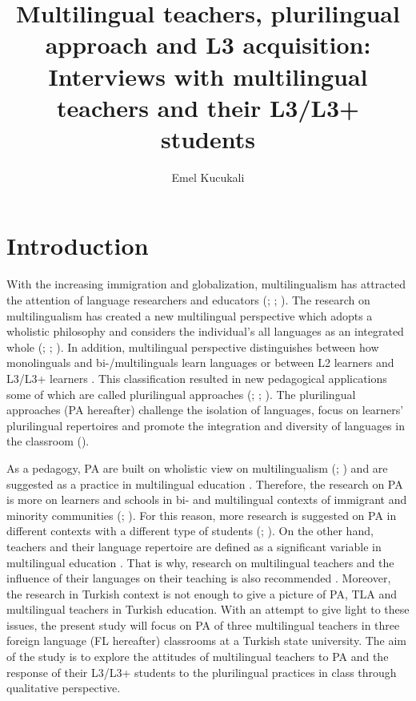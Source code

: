 \documentclass[output=paper]{../langscibook}
\author{Emel Kucukali\affiliation{Marmara University}\orcid{}}
\title{Multilingual teachers, plurilingual approach and L3 acquisition:  Interviews with multilingual teachers and their L3/L3+ students}
\begin{document}
\maketitle


\section{Introduction}


With the increasing immigration and globalization, multilingualism has attracted the attention of language researchers and educators (\citealt{CenozGenesee1998}; \citealt{Jessner1999}; \citealt{Cenoz2013a}). The research on multilingualism has created a new multilingual perspective which adopts a wholistic philosophy and considers the individual’s all languages as an integrated whole (\citealt{Cook1992}; \citealt{Grosjean2008}; \citealt{Cenoz2013a}). In addition, multilingual perspective distinguishes between how monolinguals and bi-\slash multilinguals learn languages or between L2 learners and L3/L3+ learners \citep{Hufeisen2004}. This classification resulted in new pedagogical applications some of which are called plurilingual approaches (\citealt{CouncilOfEurope2001}; \citealt{Cenoz2013a,Cenoz2013b}; \citealt{Otwinowska2014}). The plurilingual approaches (PA hereafter) challenge the isolation of languages, focus on learners' plurilingual repertoires and promote the integration and diversity of languages in the classroom (\citealt{BeaccoEtAl2010}).

As a pedagogy, PA are built on wholistic view on multilingualism (\citealt{Grosjean2008}; \citealt{Cenoz2013a,Cenoz2013b}) and are suggested as a practice in multilingual education \citep{Cenoz2009}. Therefore, the research on PA is more on learners and schools in bi- and multilingual contexts of immigrant and minority communities (\citealt{Cenoz2013b}; \citealt{GarciaLi2014}). For this reason, more research is suggested on PA in different contexts with a different type of students (\citealt{Cenoz2013a,Cenoz2013b}; \citealt{CenozGorter2017}). On the other hand, teachers and their language repertoire are defined as a significant variable in multilingual education \citep{Cenoz2009}. That is why, research on multilingual teachers and the influence of their languages on their teaching is also recommended \citep{Ellis2013}. Moreover, the research in Turkish context is not enough to give a picture of PA, TLA and multilingual teachers in Turkish education. With an attempt to give light to these issues, the present study will focus on PA of three multilingual teachers in three foreign language (FL hereafter) classrooms at a Turkish state university. The aim of the study is to explore the attitudes of multilingual teachers to PA and the response of their L3/L3+ students to the plurilingual practices in class through qualitative perspective.~
\end{document}
